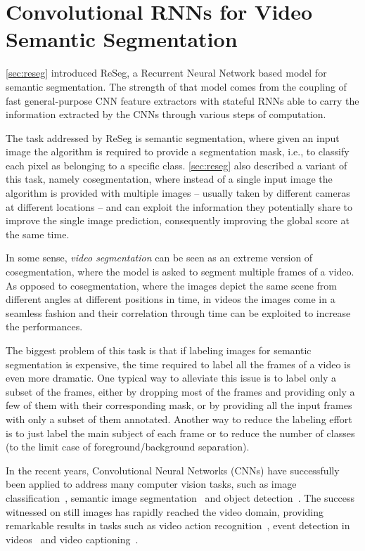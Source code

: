 \chapter{Convolutional RNNs for Video Semantic Segmentation}\label{sec:video_segmentation}

\autoref{sec:reseg} introduced ReSeg, a Recurrent Neural Network based model
for semantic segmentation. The strength of that model comes from the coupling
of fast general-purpose CNN feature extractors with stateful RNNs able to
carry the information extracted by the CNNs through various steps of
computation.

The task addressed by ReSeg is semantic segmentation, where given an input
image the algorithm is required to provide a segmentation mask, i.e., to
classify each pixel as belonging to a specific class. \autoref{sec:reseg}
also described a variant of this task, namely cosegmentation, where instead
of a single input image the algorithm is provided with multiple images --
usually taken by different cameras at different locations -- and can exploit
the information they potentially share to improve the single image prediction,
consequently improving the global score at the same time.

In some sense, \emph{video segmentation} can be seen as an extreme version
of cosegmentation, where the model is asked to segment multiple frames of a
video. As opposed to cosegmentation, where the images depict the same scene
from different angles at different positions in time, in videos the images
come in a seamless fashion and their correlation through time can be exploited
to increase the performances.

The biggest problem of this task is that if labeling images for semantic
segmentation is expensive, the time required to label all the frames of a
video is even more dramatic. One typical way to alleviate this issue is to
label only a subset of the frames, either by dropping most of the frames and
providing only a few of them with their corresponding mask, or by providing all
the input frames with only a subset of them annotated. Another way to reduce
the labeling effort is to just label the main subject of each frame or to
reduce the number of classes (to the limit case of foreground/background
separation).

In the recent years, Convolutional Neural Networks (CNNs) have successfully
been applied to address many computer vision tasks, such as image
classification~\citep{Krizhevsky2012-alexnet}, semantic image
segmentation~\citep{noh2015learning,long2014fully} and object
detection~\citep{Sermanet13overfeat}. The success witnessed on still images
has rapidly reached the video domain, providing remarkable results in tasks
such as video action recognition~\citep{simonyan2014two, karpathy2014large},
event detection in videos~\citep{yeung2015end} and video captioning~\citep{
yao2015describing}.

